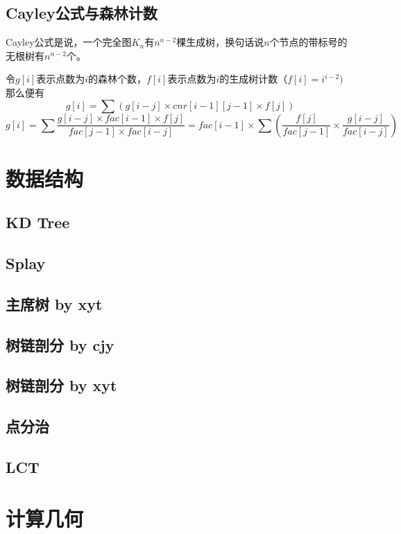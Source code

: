 \documentclass[landscape,a4paper]{article}
\begin{document}
\begin{spacing}{0.3}
\begin{multicols}{2}
		\subsection{Cayley公式与森林计数}
		Cayley公式是说，一个完全图$K_n$有$n^{n-2}$棵生成树，换句话说$n$个节点的带标号的无根树有$n^{n-2}$个。

令$g[i]$表示点数为$i$的森林个数，$f[i]$表示点数为$i$的生成树计数$（f[i]=i^{i-2})$
那么便有$$g[i]=\sum (g[i-j] \times cnr[i-1][j-1] \times f[j])$$
$$g[i]=\sum \frac{g[i-j] \times fac[i-1] \times f[j]}{fac[j-1] \times fac[i-j]}=fac[i-1] \times \sum (\frac{f[j]}{fac[j-1]} \times \frac{g[i-j]}{fac[i-j]})$$
	
	\section{数据结构}
		\subsection{KD Tree}
		
		\subsection{Splay}
		
		\subsection{主席树 by xyt}
		
		\subsection{树链剖分 by cjy}
		
		\subsection{树链剖分 by xyt}
		
		\subsection{点分治}
		
		\subsection{LCT}
		
	\section{计算几何}

\end{multicols}
\end{spacing}
\end{document}
